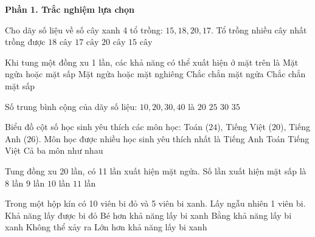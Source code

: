 \textbf{Phần 1. Trắc nghiệm lựa chọn}

\begin{ex} %
Cho dãy số liệu về số cây xanh 4 tổ trồng: $15, 18, 20, 17$. Tổ trồng nhiều cây nhất trồng được
\choice
{$18\text{ cây}$}
{$17\text{ cây}$}
{\True $20\text{ cây}$}
{$15\text{ cây}$}
\end{ex}

\begin{ex} %
Khi tung một đồng xu 1 lần, các khả năng có thể xuất hiện ở mặt trên là
\choice
{\True Mặt ngửa hoặc mặt sấp}
{Mặt ngửa hoặc mặt nghiêng}
{Chắc chắn mặt ngửa}
{Chắc chắn mặt sấp}
\end{ex}

\begin{ex} %
Số trung bình cộng của dãy số liệu: $10, 20, 30, 40$ là
\choice
{$20$}
{\True $25$}
{$30$}
{$35$}
\end{ex}

\begin{ex} %
Biểu đồ cột số học sinh yêu thích các môn học: Toán ($24$), Tiếng Việt ($20$), Tiếng Anh ($26$). Môn học được nhiều học sinh yêu thích nhất là
\choice
{\True Tiếng Anh}
{Toán}
{Tiếng Việt}
{Cả ba môn như nhau}
\end{ex}

\begin{ex} %
Tung đồng xu 20 lần, có 11 lần xuất hiện mặt ngửa. Số lần xuất hiện mặt sấp là
\choice
{$8$ lần}
{\True $9$ lần}
{$10$ lần}
{$11$ lần}
\end{ex}

\begin{ex} %
Trong một hộp kín có 10 viên bi đỏ và 5 viên bi xanh. Lấy ngẫu nhiên 1 viên bi. Khả năng lấy được bi đỏ
\choice
{Bé hơn khả năng lấy bi xanh}
{Bằng khả năng lấy bi xanh}
{Không thể xảy ra}
{\True Lớn hơn khả năng lấy bi xanh}
\end{ex}

